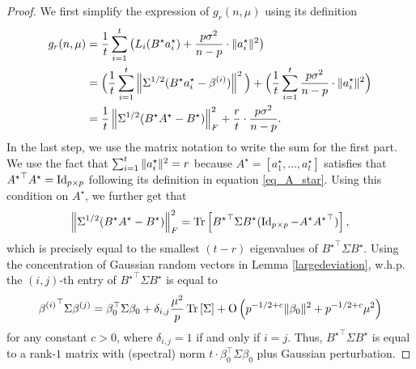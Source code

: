 \begin{proof}
    We first simplify the expression of $g_r(n, \mu)$ using its definition
    \begin{align*}
        g_r(n, \mu) &= \frac 1 t \sum_{i=1}^t \big(L_i(B^{\star} a_i^{\star}) + \frac{p\sigma^2}{n - p} \cdot \norm{a_i^{\star}}^2\big) \\
        &= \Big(\frac 1 t \sum_{i=1}^t \bignorm{\Sigma^{1/2} (B^{\star} a_i^{\star} - \beta^{(i)})}^2 \Big)
        + \Big(\frac 1 t \sum_{i=1}^t \frac{p\sigma^2}{n - p} \cdot \norm{a_i^{\star}}^2 \Big) \\
        &= \frac 1 t \bignormFro{\Sigma^{1/2} (B^{\star} A^{\star} - B^{\star})}^2 + \frac{r}{t} \cdot \frac{p\sigma^2}{n - p}.
    \end{align*}
    In the last step, we use the matrix notation to write the sum for the first part.
    We use the fact that $\sum_{i=1}^t \|a_i^{\star}\|^2 = r$ because $A^{\star} = [a_1^{\star}, \dots, a_t^{\star}]$ satisfies that ${A^{\star}}^{\top} A^{\star} = \operatorname{Id}_{p\times p}$ following its definition in equation \eqref{eq_A_star}.
    Using this condition on $A^{\star}$, we further get that
    \begin{align*}
        \bignormFro{\Sigma^{1/2}(B^{\star} A^{\star} - B^{\star})}^2
        = \bigtr{{B^{\star}}^{\top} \Sigma B^{\star} (\id_{p \times p} - A^{\star}{A^{\star}}^{\top})},
    \end{align*}
    which is precisely equal to the smallest $(t - r)$ eigenvalues of ${B^{\star}}^{\top}\Sigma B^{\star}$.
    Using the concentration of Gaussian random vectors in Lemma \ref{largedeviation}, w.h.p. the $(i, j)$-th entry of ${B^{\star}}^{\top} \Sigma B^{\star}$ is equal to
    \begin{align}\label{betaSbeta}
    	{\beta^{(i)}}^{\top}\Sigma  {\beta^{(j)}} =\beta_0^\top \Sigma \beta_0 + \delta_{i,j} \frac{\mu^2 }{p}\bigtr{\Sigma} + \OO\left(p^{-1/2+c}\|\beta_0\|^2+ p^{-1/2+c} \mu^2\right)
    \end{align}
    for any constant $c>0$, where $\delta_{i,j} = 1$ if and only if $i = j$.
    Thus, ${B^{\star}}^{\top} \Sigma B^{\star}$ is equal to a rank-$1$ matrix with (spectral) norm $t\cdot \beta_0^{\top} \Sigma \beta_0$ plus Gaussian perturbation.

\end{proof}
